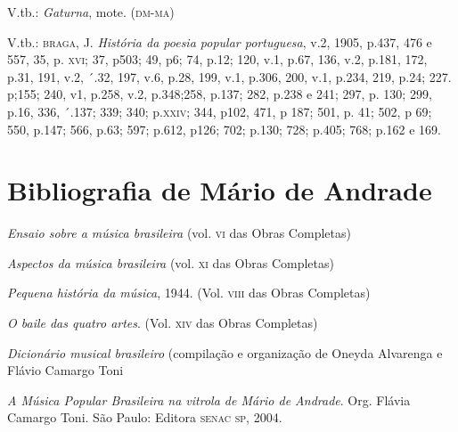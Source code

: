 V.tb.: \emph{Gaturna}, mote. (\textsc{dm-ma})

V.tb.: \textsc{braga}, J. \emph{História da poesia popular portuguesa}, v.2,
1905, p.437, 476 e 557, 35, p. \textsc{xvi}; 37, p503; 49, p6; 74, p.12; 120,
v.1, p.67, 136, v.2, p.181, 172, p.31, 191, v.2, ´.32, 197, v.6, p.28,
199, v.1, p.306, 200, v.1, p.234, 219, p.24; 227. p;155; 240, v1, p.258,
v.2, p.348;258, p.137; 282, p.238 e 241; 297, p. 130; 299, p.16, 336,
´.137; 339; 340; p.\textsc{xxiv}; 344, p102, 471, p 187; 501, p. 41; 502, p 69;
550, p.147; 566, p.63; 597; p.612, p126; 702; p.130; 728; p.405; 768;
p.162 e 169.


\chapter{Bibliografia de Mário de Andrade}

\emph{Ensaio sobre a música brasileira} (vol. \textsc{vi} das Obras Completas)

\emph{Aspectos da música brasileira} (vol. \textsc{xi} das Obras Completas)

\emph{Pequena história da música}, 1944. (Vol. \textsc{viii} das Obras Completas)

\emph{O baile das quatro artes}. (Vol. \textsc{xiv} das Obras Completas)

\emph{Dicionário musical brasileiro} (compilação e organização de Oneyda
Alvarenga e Flávio Camargo Toni

\emph{A Música Popular Brasileira na vitrola de Mário de Andrade}. Org.
Flávia Camargo Toni. São Paulo: Editora \textsc{senac sp}, 2004.


